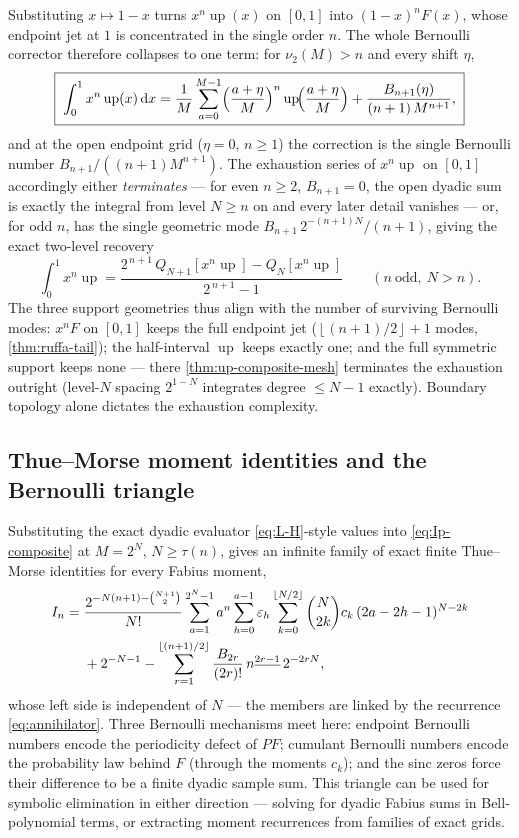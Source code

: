 \documentclass[11pt,oneside]{article}
\numberwithin{equation}{section}
\theoremstyle{definition}
\theoremstyle{remark}
\newcommand{\dd}{\,\mathrm d}
\newcommand{\Up}{\operatorname{up}}
\newcommand{\eps}{\varepsilon}
\newcommand{\vtwo}{\nu_2}
\newcommand{\fall}[2]{#1^{\underline{#2}}}
\newcommand{\floor}[1]{\left\lfloor #1\right\rfloor}
\begin{document}
Substituting $x\mapsto1-x$ turns $x^{n}\Up(x)$ on $[0,1]$ into
$(1-x)^{n}F(x)$, whose endpoint jet at $1$ is concentrated in the
single order $n$.  The whole Bernoulli corrector therefore collapses
to one term: for $\vtwo(M)>n$ and every shift $\eta$,
\begin{equation}
 \boxed{\;
 \int_0^1x^{n}\Up(x)\dd x
 =\frac1M\sum_{a=0}^{M-1}
 \Bigl(\frac{a+\eta}{M}\Bigr)^{n}
 \Up\!\Bigl(\frac{a+\eta}{M}\Bigr)
 +\frac{B_{n+1}(\eta)}{(n+1)\,M^{n+1}},\;}
 \label{eq:half-up-rule}
\end{equation}
and at the open endpoint grid ($\eta=0$, $n\ge1$) the correction is
the single Bernoulli number $B_{n+1}/((n+1)M^{n+1})$.  The exhaustion
series of $x^{n}\Up$ on $[0,1]$ accordingly either \emph{terminates}
--- for even $n\ge2$, $B_{n+1}=0$, the open dyadic sum is exactly the
integral from level $N\ge n$ on and every later detail vanishes ---
or, for odd $n$, has the single geometric mode
$B_{n+1}\,2^{-(n+1)N}/(n+1)$, giving the exact two-level recovery
\begin{equation}
 \int_0^1x^{n}\Up
 =\frac{2^{\,n+1}\,Q_{N+1}[x^{n}\Up]-Q_N[x^{n}\Up]}{2^{\,n+1}-1}
 \qquad(n\ \text{odd},\ N>n).
 \label{eq:half-up-two-level}
\end{equation}
The three support geometries thus align with the number of surviving
Bernoulli modes: $x^{n}F$ on $[0,1]$ keeps the full endpoint jet
($\floor{(n+1)/2}+1$ modes, \cref{thm:ruffa-tail}); the half-interval
$\Up$ keeps exactly one; and the full symmetric support keeps none ---
there \cref{thm:up-composite-mesh} terminates the exhaustion outright
(level-$N$ spacing $2^{1-N}$ integrates degree $\le N-1$ exactly).
Boundary topology alone dictates the exhaustion complexity.

\subsection{Thue--Morse moment identities and the Bernoulli triangle}

Substituting the exact dyadic evaluator \eqref{eq:L-H}-style values
into \eqref{eq:Ip-composite} at $M=2^{N}$, $N\ge\tau(n)$, gives an
infinite family of exact finite Thue--Morse identities for every
Fabius moment,
\begin{align}
 I_n
 ={}&\frac{2^{-N(n+1)-\binom{N+1}2}}{N!}
 \sum_{a=1}^{2^{N}-1}a^{n}
 \sum_{h=0}^{a-1}\eps_h
 \sum_{k=0}^{\floor{N/2}}\binom N{2k}c_k\,(2a-2h-1)^{N-2k}
 \notag\\
 &+2^{-N-1}
 -\sum_{r=1}^{\floor{(n+1)/2}}
 \frac{B_{2r}}{(2r)!}\,\fall n{2r-1}\,2^{-2rN},
 \label{eq:In-TM-family}
\end{align}
whose left side is independent of $N$ --- the members are linked by the
recurrence \eqref{eq:annihilator}.  Three Bernoulli mechanisms meet
here: endpoint Bernoulli numbers encode the periodicity defect of
$PF$; cumulant Bernoulli numbers encode the probability law behind $F$
(through the moments $c_k$); and the sinc zeros force their difference
to be a finite dyadic sample sum.  This triangle can be used for
symbolic elimination in either direction --- solving for dyadic Fabius
sums in Bell-polynomial terms, or extracting moment recurrences from
families of exact grids.
\end{document}
